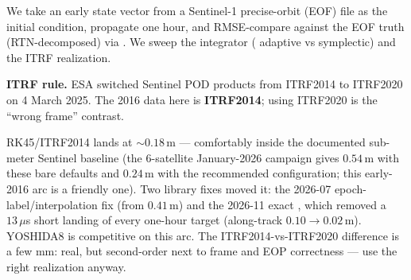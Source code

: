 We take an early state vector from a Sentinel-1 precise-orbit (EOF) file as
the initial condition, propagate one hour, and RMSE-compare against the EOF
truth (RTN-decomposed) via . We sweep the
integrator ( adaptive vs  symplectic) and the ITRF
realization.

\textbf{ITRF rule.} ESA switched Sentinel POD products from ITRF2014 to
ITRF2020 on 4 March 2025. The 2016 data here is \textbf{ITRF2014}; using
ITRF2020 is the ``wrong frame'' contrast.


RK45/ITRF2014 lands at ${\sim}0.18\,$m --- comfortably inside the
documented sub-meter Sentinel baseline (the 6-satellite January-2026
campaign gives $0.54\,$m with these bare defaults and $0.24\,$m with the
recommended configuration; this early-2016 arc is a friendly one). Two
library fixes moved it: the 2026-07 epoch-label/interpolation fix (from
$0.41\,$m) and the 2026-11 exact , which removed a
$13\,\mu$s short landing of every one-hour target (along-track
$0.10 \to 0.02\,$m). YOSHIDA8 is competitive on this arc.
The ITRF2014-vs-ITRF2020 difference is a few mm: real, but second-order
next to frame and EOP correctness --- use the right realization anyway.
